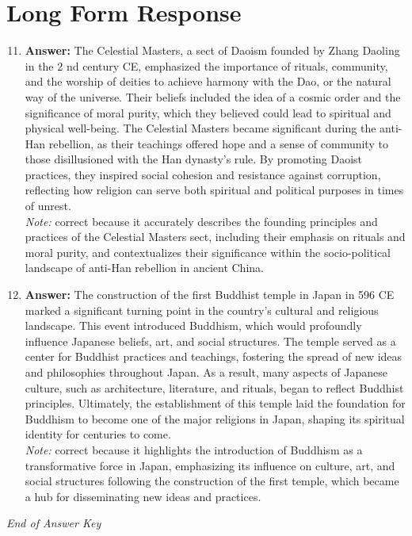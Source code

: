 \documentclass[12pt]{article}
\begin{document}
\section*{Long Form Response}
\begin{enumerate}[label=\arabic*.]
\setcounter{enumi}{10}
\item \textbf{Answer:} The Celestial Masters, a sect of Daoism founded by Zhang Daoling in the 2 nd century CE, emphasized the importance of rituals, community, and the worship of deities to achieve harmony with the Dao, or the natural way of the universe. Their beliefs included the idea of a cosmic order and the significance of moral purity, which they believed could lead to spiritual and physical well-being. The Celestial Masters became significant during the anti-Han rebellion, as their teachings offered hope and a sense of community to those disillusioned with the Han dynasty's rule. By promoting Daoist practices, they inspired social cohesion and resistance against corruption, reflecting how religion can serve both spiritual and political purposes in times of unrest.
\\ \textit{Note:} correct because it accurately describes the founding principles and practices of the Celestial Masters sect, including their emphasis on rituals and moral purity, and contextualizes their significance within the socio-political landscape of anti-Han rebellion in ancient China.
\item \textbf{Answer:} The construction of the first Buddhist temple in Japan in 596 CE marked a significant turning point in the country's cultural and religious landscape. This event introduced Buddhism, which would profoundly influence Japanese beliefs, art, and social structures. The temple served as a center for Buddhist practices and teachings, fostering the spread of new ideas and philosophies throughout Japan. As a result, many aspects of Japanese culture, such as architecture, literature, and rituals, began to reflect Buddhist principles. Ultimately, the establishment of this temple laid the foundation for Buddhism to become one of the major religions in Japan, shaping its spiritual identity for centuries to come.
\\ \textit{Note:} correct because it highlights the introduction of Buddhism as a transformative force in Japan, emphasizing its influence on culture, art, and social structures following the construction of the first temple, which became a hub for disseminating new ideas and practices.
\end{enumerate}

\vfill
\noindent\textit{End of Answer Key}
\end{document}
